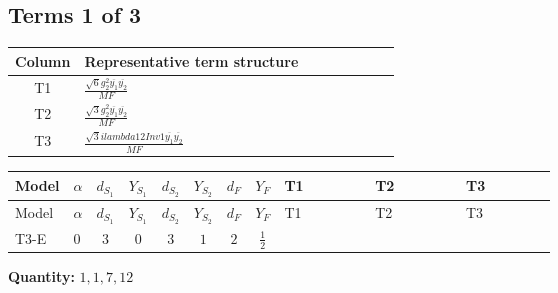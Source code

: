 \documentclass[8pt]{article}
\begin{document}
\begin{landscape}
\subsection*{Terms 1 of 3}
\begin{center}
\begin{tabular}{@{}c >{\raggedright\arraybackslash}p{0.82\linewidth}@{}}
\toprule
Column & Representative term structure \\
\midrule
T1 & \(\displaystyle \frac{\sqrt{6} g_{2}^{2} \overline{y_{1}} \overline{y_{2}}}{MF}\) \\
\midrule
T2 & \(\displaystyle \frac{\sqrt{3} g_{2}^{2} \overline{y_{1}} \overline{y_{2}}}{MF}\) \\
\midrule
T3 & \(\displaystyle \frac{\sqrt{3} i lambda12Inv1 \overline{y_{1}} \overline{y_{2}}}{MF}\) \\
\midrule
\bottomrule
\end{tabular}
\end{center}
\smallskip
\tiny
\begin{longtable}{@{}llcccccc >{\raggedright\arraybackslash}p{0.21\linewidth} >{\raggedright\arraybackslash}p{0.21\linewidth} >{\raggedright\arraybackslash}p{0.21\linewidth}@{}}
\toprule
Model & $\alpha$ & $d_{S_1}$ & $Y_{S_1}$ & $d_{S_2}$ & $Y_{S_2}$ & $d_F$ & $Y_F$ & T1 & T2 & T3 \\
\midrule
\endfirsthead
\toprule
Model & $\alpha$ & $d_{S_1}$ & $Y_{S_1}$ & $d_{S_2}$ & $Y_{S_2}$ & $d_F$ & $Y_F$ & T1 & T2 & T3 \\
\midrule
\endhead
T3-E & $0$ & $3$ & $0$ & $3$ & $1$ & $2$ & $\frac{1}{2}$ & \scriptsize\adjustbox{max width=\linewidth}{$\begin{gathered} - \frac{\sqrt{6} g_{2}^{2} \overline{y_{1}} \overline{y_{2}}}{3 MF}\end{gathered}$} & \scriptsize\adjustbox{max width=\linewidth}{$\begin{gathered} - \frac{\sqrt{3} g_{2}^{2} \overline{y_{1}} \overline{y_{2}}}{6 MF}\end{gathered}$} & \scriptsize\adjustbox{max width=\linewidth}{$\begin{gathered} - \frac{\sqrt{3} i lambda12Inv1 \overline{y_{1}} \overline{y_{2}}}{6 MF}\end{gathered}$} \\
\midrule
\bottomrule
\end{longtable}
\clearpage
\noindent\textbf{Quantity: }$\mathrm{1,1,7,12}$\par\smallskip

\end{landscape}
\end{document}
